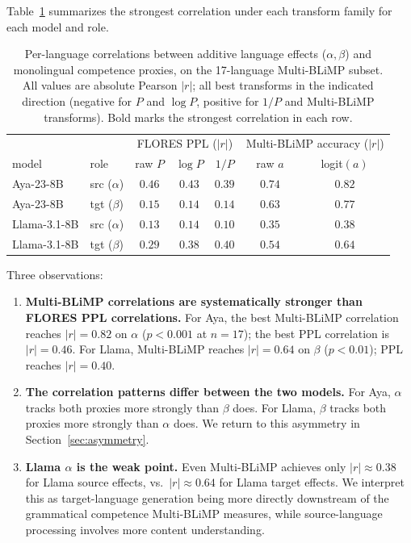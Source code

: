 \documentclass[11pt]{article}
\begin{document}
Table~\ref{tab:headline-corr} summarizes the strongest correlation
under each transform family for each model and role.

\begin{table}[h]
\centering
\small
\begin{tabular}{llccc|cc}
\toprule
 & & \multicolumn{3}{c|}{FLORES PPL ($|r|$)}
   & \multicolumn{2}{c}{Multi-BLiMP accuracy ($|r|$)} \\
model & role & raw $P$ & $\log P$ & $1/P$ & raw $a$ & logit$(a)$ \\
\midrule
Aya-23-8B    & src ($\alpha$) & $0.46$ & $0.43$ & $0.39$ & $0.74$ & $\mathbf{0.82}$ \\
Aya-23-8B    & tgt ($\beta$)  & $0.15$ & $0.14$ & $0.14$ & $0.63$ & $\mathbf{0.77}$ \\
Llama-3.1-8B & src ($\alpha$) & $0.13$ & $0.14$ & $0.10$ & $0.35$ & $0.38$ \\
Llama-3.1-8B & tgt ($\beta$)  & $0.29$ & $0.38$ & $0.40$ & $0.54$ & $\mathbf{0.64}$ \\
\bottomrule
\end{tabular}
\caption{Per-language correlations between additive language effects
($\alpha, \beta$) and monolingual competence proxies, on the
17-language Multi-BLiMP subset. All values are absolute Pearson $|r|$;
all best transforms in the indicated direction (negative for $P$ and
$\log P$, positive for $1/P$ and Multi-BLiMP transforms).
Bold marks the strongest correlation in each row.}
\label{tab:headline-corr}
\end{table}

Three observations:

\begin{enumerate}
  \item \textbf{Multi-BLiMP correlations are systematically stronger
    than FLORES PPL correlations.} For Aya, the best Multi-BLiMP
    correlation reaches $|r| = 0.82$ on $\alpha$ ($p < 0.001$ at $n =
    17$); the best PPL correlation is $|r| = 0.46$. For Llama,
    Multi-BLiMP reaches $|r| = 0.64$ on $\beta$ ($p < 0.01$); PPL
    reaches $|r| = 0.40$.
  \item \textbf{The correlation patterns differ between the two
    models.} For Aya, $\alpha$ tracks both proxies more strongly than
    $\beta$ does. For Llama, $\beta$ tracks both proxies more strongly
    than $\alpha$ does. We return to this asymmetry in
    Section~\ref{sec:asymmetry}.
  \item \textbf{Llama $\alpha$ is the weak point.} Even Multi-BLiMP
    achieves only $|r| \approx 0.38$ for Llama source effects, vs.\
    $|r| \approx 0.64$ for Llama target effects. We interpret this as
    target-language generation being more directly downstream of the
    grammatical competence Multi-BLiMP measures, while source-language
    processing involves more content understanding.
\end{enumerate}
\end{document}
